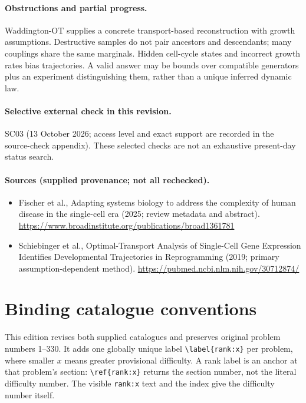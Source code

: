 \documentclass[11pt]{article}
\begin{document}
\paragraph{Obstructions and partial progress.} Waddington-OT supplies a concrete transport-based reconstruction with growth assumptions. Destructive samples do not pair ancestors and descendants; many couplings share the same marginals. Hidden cell-cycle states and incorrect growth rates bias trajectories. A valid answer may be bounds over compatible generators plus an experiment distinguishing them, rather than a unique inferred dynamic law.
\paragraph{Selective external check in this revision.} SC03 (13 October 2026; access level and exact support are recorded in the source-check appendix). These selected checks are not an exhaustive present-day status search.

\paragraph{Sources (supplied provenance; not all rechecked).}
\begin{itemize}
\item Fischer et al., Adapting systems biology to address the complexity of human disease in the single-cell era (2025; review metadata and abstract). \url{https://www.broadinstitute.org/publications/broad1361781}
\item Schiebinger et al., Optimal-Transport Analysis of Single-Cell Gene Expression Identifies Developmental Trajectories in Reprogramming (2019; primary assumption-dependent method). \url{https://pubmed.ncbi.nlm.nih.gov/30712874/}
\end{itemize}


\section*{Binding catalogue conventions}
This edition revises both supplied catalogues and preserves original problem numbers 1--330. It adds one globally unique label \verb|\label{rank:x}| per problem, where smaller $x$ means greater provisional difficulty. A rank label is an anchor at that problem's section: \verb|\ref{rank:x}| returns the section number, not the literal difficulty number. The visible \texttt{rank:x} text and the index give the difficulty number itself.
\end{document}
